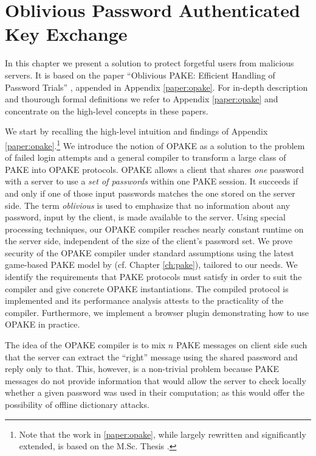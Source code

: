 \chapter{Oblivious Password Authenticated Key Exchange}\label{ch:opake}
In this chapter we present a solution to protect forgetful users from malicious servers.
It is based on the paper ``Oblivious PAKE: Efficient Handling of Password Trials'' \cite{Kiefer13a}, appended in Appendix \ref{paper:opake}.
For in-depth description and thourough formal definitions we refer to Appendix \ref{paper:opake} and concentrate on the high-level concepts in these papers.

We start by recalling the high-level intuition and findings of Appendix \ref{paper:opake}.\footnote{Note that the work in \ref{paper:opake}, while largely rewritten and significantly extended, is based on the M.Sc. Thesis \cite{Kiefer2012}.}
We introduce the notion of \acl{OPAKE} as a solution to the problem of failed login attempts and a general compiler to transform a large class of \ac{PAKE} into \ac{OPAKE} protocols.
\ac{OPAKE} allows a client that shares \emph{one} password with a server to use a \emph{set of passwords} within one \ac{PAKE} session.
It succeeds if and only if one of those input passwords matches the one stored on the server side.
The term \emph{oblivious} is used to emphasize that no information about any password, input by the client, is made available to the server.
Using special processing techniques, our \ac{OPAKE} compiler reaches nearly constant runtime on the server side, independent of the size of the client's password set.
We prove security of the \ac{OPAKE} compiler under standard assumptions using the latest game-based \ac{PAKE} model by \citeauthor{Abdalla2005} (cf. Chapter \ref{ch:pake}), tailored to our needs.
We identify the requirements that \ac{PAKE} protocols must satisfy in order to suit the compiler and give concrete \ac{OPAKE} instantiations.
The compiled protocol is implemented and its performance analysis attests to the practicality of the compiler.
Furthermore, we implement a browser plugin demonstrating how to use \ac{OPAKE} in practice.

The idea of the \ac{OPAKE} compiler is to mix $n$ \ac{PAKE} messages on client side such that the server can extract the ``right'' message using the shared password and reply only to that.
This, however, is a non-trivial problem because \ac{PAKE} messages do not provide information that would allow the server to check locally whether a given password was used in their computation; as this would offer the possibility of offline dictionary attacks.


